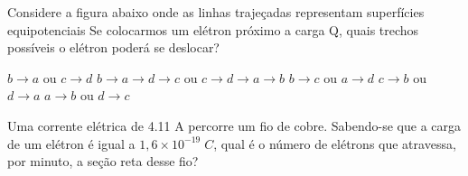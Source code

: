 \documentclass[12pt, addpoints]{exam}
\begin{document}
    \begin{questions}
\begin{multicols*}{2}
\question Considere a figura abaixo onde as linhas trajeçadas representam superfícies equipotenciais Se colocarmos um elétron próximo a carga Q, quais trechos possíveis o elétron poderá se deslocar?
        
        \begin{center}
            \begin{minipage}[c]{0.5\linewidth}
            \end{minipage}
        \end{center}
        
        

\begin{choices}
\choice $b\rightarrow a$ ou $c\rightarrow d$ 
\choice $b\rightarrow a\rightarrow d\rightarrow c$ ou $c\rightarrow d\rightarrow a\rightarrow b$ 
\choice $b\rightarrow c$ ou $a\rightarrow d$ 
\choice $c\rightarrow b$ ou $d\rightarrow a$ 
\choice $a\rightarrow b$ ou $d\rightarrow c$ 
\end{choices}
\question Uma corrente elétrica de    4.11 A percorre um ﬁo de cobre. Sabendo-se que a carga de um elétron é igual a $1,6\times 10^{-19}\;C$, qual é o número de elétrons que atravessa, por minuto, a seção reta desse ﬁo?


\end{multicols*}
\end{questions}
\end{document}
